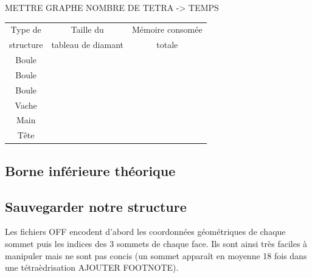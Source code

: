 \documentclass[a4paper,11pt,openany]{article}
\begin{document}
METTRE GRAPHE NOMBRE DE TETRA -> TEMPS

\begin{table}[H]
\footnotesize
\begin{tabular}{|c | c | c |}
\hline
Type de & Taille du & Mémoire consomée \\
structure & tableau de diamant & totale \\
\hline
Boule & & \\
Boule & & \\
Boule & & \\
Vache &  & \\
Main &  & \\
Tête &  & \\
\hline  
\end{tabular}
\label{Tab:results_memory}
\end{table}
\noindent

\subsection{Borne inférieure théorique}

\subsection{Sauvegarder notre structure}
\noindent
Les fichiers OFF encodent d'abord les coordonnées géométriques de chaque sommet puis les indices des 3 sommets de chaque face. Ils sont ainsi très faciles à manipuler mais ne sont pas concis (un sommet apparaît en moyenne 18 fois dans une tétraèdrisation AJOUTER FOOTNOTE).
\end{document}
